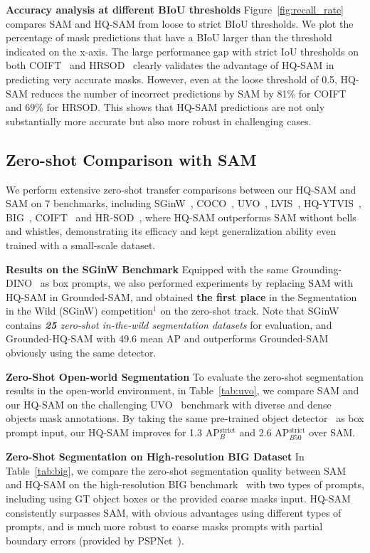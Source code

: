 \textbf{Accuracy analysis at different BIoU thresholds}  Figure~\ref{fig:recall_rate} compares SAM and HQ-SAM from loose to strict BIoU thresholds. We plot the percentage of mask predictions that have a BIoU larger than the threshold indicated on the x-axis. The large performance gap with strict IoU thresholds on both COIFT~\cite{liew2021deep} and HRSOD~\cite{zeng2019towards} clearly validates the advantage of HQ-SAM in predicting very accurate masks. However, even at the loose threshold of 0.5, HQ-SAM reduces the number of incorrect predictions by SAM by 81\% for COIFT and 69\% for HRSOD. This shows that HQ-SAM predictions are not only substantially more accurate but also more robust in challenging cases.

\subsection{Zero-shot Comparison with SAM} We perform extensive zero-shot transfer comparisons between our HQ-SAM and SAM on 7 benchmarks, including SGinW~\cite{zou2023generalized}, COCO~\cite{lin2014microsoft}, UVO~\cite{uvo}, LVIS~\cite{gupta2019lvis}, HQ-YTVIS~\cite{vmt}, BIG~\cite{cascadepsp}, COIFT~\cite{liew2021deep} and HR-SOD~\cite{zeng2019towards}, where HQ-SAM outperforms SAM without bells and whistles, demonstrating its efficacy and kept generalization ability even trained with a small-scale dataset.

\textbf{Results on the SGinW Benchmark}  Equipped with the same Grounding-DINO~\cite{liu2023grounding} as box prompts, we also performed experiments by replacing SAM with HQ-SAM in Grounded-SAM, and obtained \textbf{the first place} in the Segmentation in the Wild (SGinW) competition\textcolor{red}{$^1$} on the zero-shot track. Note that SGinW contains \textit{\textbf{25} zero-shot in-the-wild segmentation datasets} for evaluation, and Grounded-HQ-SAM with 49.6 mean AP and outperforms Grounded-SAM obviously using the same detector. 

\textbf{Zero-Shot Open-world Segmentation}  To evaluate the zero-shot segmentation results in the open-world environment, in Table~\ref{tab:uvo}, we compare SAM and our HQ-SAM on the challenging UVO~\cite{uvo} benchmark with diverse and dense objects mask annotations. By taking the same pre-trained object detector~\cite{dino} as box prompt input, our HQ-SAM improves for 1.3 AP$_{B}^\text{strict}$ and 2.6 AP$_{B50}^\text{strict}$ over SAM. 

\textbf{Zero-Shot Segmentation on High-resolution BIG Dataset}  In Table~\ref{tab:big}, we compare the zero-shot segmentation quality between SAM and HQ-SAM on the high-resolution BIG benchmark~\cite{cascadepsp} with two types of prompts, including using GT object boxes or the provided coarse masks input. HQ-SAM consistently surpasses SAM, with obvious advantages using different types of prompts, and is much more robust to coarse masks prompts with partial boundary errors (provided by PSPNet~\cite{zhao2017pyramid}).

